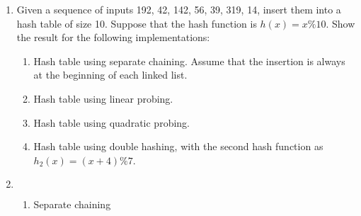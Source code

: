 \documentclass[12pt,a4paper]{article}
\makeatletter
\newtheorem*{solution}{Solution}
\theoremstyle{definition}
\renewenvironment{solution}[1][Solution] {\par\pushQED{\qed}\normalfont\topsep6\p@\@plus6\p@\relax\trivlist\item[\hskip\labelsep\bfseries#1\@addpunct{.}]\ignorespaces}{\popQED\endtrivlist\@endpefalse} \makeatother
\makeatother
\begin{document}
\begin{enumerate}

\item  Given a sequence of inputs 192, 42, 142, 56, 39, 319, 14, insert them
into a hash table of size 10. Suppose that the hash function is $h(x) = x\%10$. Show the
result for the following implementations:
	\begin{enumerate}
	\item Hash table using separate chaining. Assume that the insertion is always at the
beginning of each linked list.
	\item Hash table using linear probing.
	\item Hash table using quadratic probing.
	\item Hash table using double hashing, with the second hash function as $h_2 (x) = (x+4)\%7$.
	\end{enumerate}
\begin{solution}
	$\ $  \\
	\begin{enumerate}
		\item Separate chaining
			\begin{table}[h]
				\centering
				

\end{table}
\end{enumerate}
\end{solution}
\end{enumerate}
\end{document}
